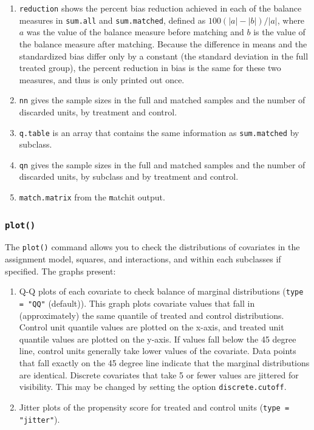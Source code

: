 \documentclass[oneside,letterpaper,titlepage]{article}
\begin{document}
\begin{enumerate}
\item \texttt{reduction} shows the percent bias reduction achieved in
  each of the balance measures in \texttt{sum.all} and
  \texttt{sum.matched}, defined as $100(|a|-|b|)/|a|$, where $a$ was
  the value of the balance measure before matching and $b$ is the
  value of the balance measure after matching.  Because the difference
  in means and the standardized bias differ only by a constant (the
  standard deviation in the full treated group), the percent reduction
  in bias is the same for these two measures, and thus is only printed
  out once.

\item \texttt{nn} gives the sample sizes in the full and matched
  samples and the number of discarded units, by treatment and control.
  
\item \texttt{q.table} is an array that contains the same information
  as \texttt{sum.matched} by subclass.
  
\item \texttt{qn} gives the sample sizes in the full and matched
  samples and the number of discarded units, by subclass and by
  treatment and control.
\item \texttt{match.matrix} from the {\texttt matchit} output.
\end{enumerate}

\subsubsection{{\tt plot()}}

The \texttt{plot()} command allows you to check the distributions of
covariates in the assignment model, squares, and interactions, and
within each subclasses if specified.  The graphs present:
\begin{enumerate}
\item Q-Q plots of each covariate to check balance of marginal
  distributions (\texttt{type = "QQ"} (default)).  This graph plots
  covariate values that fall in (approximately) the same quantile of
  treated and control distributions.  Control unit quantile values are
  plotted on the x-axis, and treated unit quantile values are plotted
  on the y-axis.  If values fall below the 45 degree line, control
  units generally take lower values of the covariate.  Data points
  that fall exactly on the 45 degree line indicate that the marginal
  distributions are identical.  Discrete covariates that take 5 or
  fewer values are jittered for visibility.  This may be changed by
  setting the option \texttt{discrete.cutoff}.
\item Jitter plots of the propensity score for treated and control
  units (\texttt{type = "jitter"}).
\end{enumerate}
\end{document}
